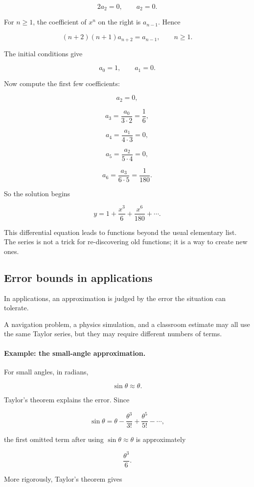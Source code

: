 \[
2a_2=0,
\qquad
a_2=0.
\]

For \(n\ge1\), the coefficient of \(x^n\) on the right is \(a_{n-1}\).  Hence

\[
(n+2)(n+1)a_{n+2}=a_{n-1},
\qquad n\ge1.
\]

The initial conditions give

\[
a_0=1,
\qquad
a_1=0.
\]

Now compute the first few coefficients:

\[
a_2=0,
\]

\[
a_3=\frac{a_0}{3\cdot2}=\frac16,
\]

\[
a_4=\frac{a_1}{4\cdot3}=0,
\]

\[
a_5=\frac{a_2}{5\cdot4}=0,
\]

\[
a_6=\frac{a_3}{6\cdot5}=\frac1{180}.
\]

So the solution begins

\[
\boxed{
y=1+\frac{x^3}{6}+\frac{x^6}{180}+\cdots.
}
\]

This differential equation leads to functions beyond the usual elementary list.  The
series is not a trick for re-discovering old functions; it is a way to create new ones.

\subsection{Error bounds in applications}
\label{subsec:error-bounds-applications-taylor}

In applications, an approximation is judged by the error the situation can tolerate.

A navigation problem, a physics simulation, and a classroom estimate may all use the
same Taylor series, but they may require different numbers of terms.

\paragraph{Example: the small-angle approximation.}
For small angles, in radians,

\[
\sin \theta\approx \theta.
\]

Taylor's theorem explains the error.  Since

\[
\sin \theta
=
\theta-\frac{\theta^3}{3!}+\frac{\theta^5}{5!}-\cdots,
\]

the first omitted term after using \(\sin\theta\approx\theta\) is approximately

\[
\frac{\theta^3}{6}.
\]

More rigorously, Taylor's theorem gives

